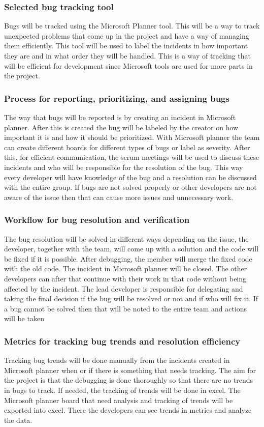 \documentclass{article}
\begin{document}
\subsubsection{Selected bug tracking tool} 
Bugs will be tracked using the Microsoft Planner tool. This will be a way to track unexpected problems that come up in the project and have a way of managing them efficiently. This tool will be used to label the incidents in how important they are and in what order they will be handled. This is a way of tracking that will be efficient for development since Microsoft tools are used for more parts in the project. 


\subsubsection{Process for reporting, prioritizing, and assigning bugs}
The way that bugs will be reported is by creating an incident in Microsoft planner. After this is created the bug will be labeled by the creator on how important it is and how it should be prioritized. With Microsoft planner the team can create different boards for different types of bugs or label as severity. After this, for efficient communication, the scrum meetings will be used to discuss these incidents and who will be responsible for the resolution of the bug. This way every developer will have knowledge of the bug and a resolution can be discussed with the entire group. If bugs are not solved properly or other developers are not aware of the issue then that can cause more issues and unnecessary work.


\subsubsection{Workflow for bug resolution and verification}
The bug resolution will be solved in different ways depending on the issue, the developer, together with the team, will come up with a solution and the code will be fixed if it is possible. After debugging, the member will merge the fixed code with the old code. The incident in Microsoft planner will be closed. The other developers can after that continue with their work in that code without being affected by the incident. The lead developer is responsible for delegating and taking the final decision if the bug will be resolved or not and if who will fix it. If a bug cannot be solved then that will be noted to the entire team and actions will be taken 


\subsubsection{Metrics for tracking bug trends and resolution efficiency}
Tracking bug trends will be done manually from the incidents created in Microsoft planner when or if there is something that needs tracking. The aim for the project is that the debugging is done thoroughly so that there are no trends in bugs to track. If needed,  the tracking of trends will be done in excel. The Microsoft planner board that need analysis and tracking of trends will be exported into excel. There the developers can see trends in metrics and analyze the data. 
\end{document}
